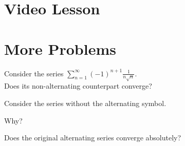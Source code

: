 \documentclass{ximera}
\begin{document}
\section{Video Lesson}




\begin{center}
\begin{foldable}
\end{foldable}
\end{center}


\section{More Problems}



\begin{problem}
Consider the series $\displaystyle{\sum_{n=1}^\infty (-1)^{n+1} \frac{1}{n\sqrt n}}$.\\
Does its non-alternating counterpart converge?
\begin{hint} 
Consider the series without the alternating symbol.
\end{hint}
\begin{multipleChoice}
\end{multipleChoice}

Why?
\begin{multipleChoice}
\end{multipleChoice}


Does the original alternating series converge absolutely?
\begin{multipleChoice}
\end{multipleChoice}

\end{problem}
\end{document}
